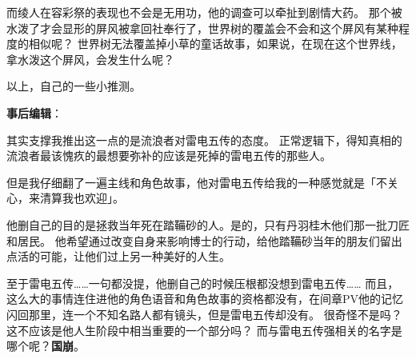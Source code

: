 \begin{multicols}{2}
	而绫人在容彩祭的表现也不会是无用功，他的调查可以牵扯到剧情大药。
	那个被水泼了才会显形的屏风被拿回社奉行了，世界树的覆盖会不会和这个屏风有某种程度的相似呢？
	世界树无法覆盖掉小草的童话故事，如果说，在现在这个世界线，拿水泼这个屏风，会发生什么呢？

	以上，自己的一些小推测。

	\textbf{事后编辑}：

	其实支撑我推出这一点的是流浪者对雷电五传的态度。
	正常逻辑下，得知真相的流浪者最该愧疚的最想要弥补的应该是死掉的雷电五传的那些人。

	但是我仔细翻了一遍主线和角色故事，他对雷电五传给我的一种感觉就是「不关心，来清算我也欢迎」。

	他删自己的目的是拯救当年死在踏鞴砂的人。是的，只有丹羽桂木他们那一批刀匠和居民。
	他希望通过改变自身来影响博士的行动，给他踏鞴砂当年的朋友们留出点活的可能，让他们过上另一种美好的人生。

	至于雷电五传……一句都没提，他删自己的时候压根都没想到雷电五传……
	而且，这么大的事情连住进他的角色语音和角色故事的资格都没有，在间章PV他的记忆闪回那里，连一个不知名路人都有镜头，但是雷电五传却没有。
	很奇怪不是吗？这不应该是他人生阶段中相当重要的一个部分吗？
	而与雷电五传强相关的名字是哪个呢？\textbf{国崩}。

\end{multicols}


